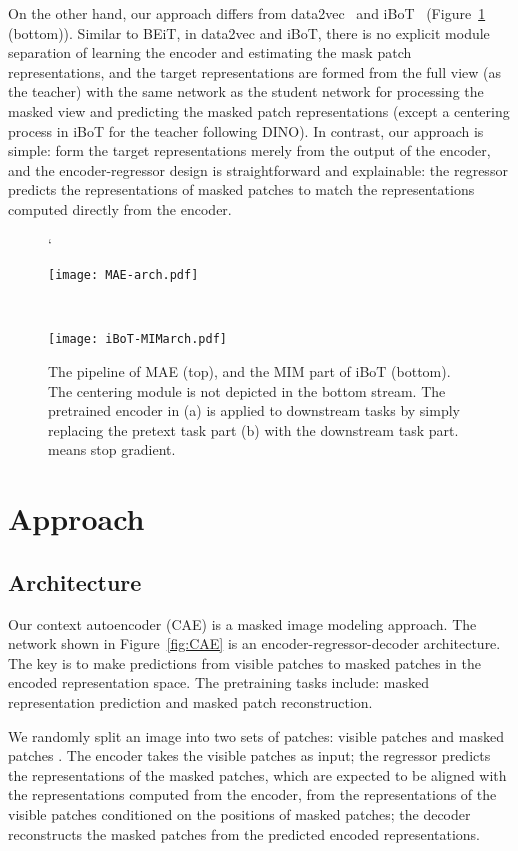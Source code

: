 \documentclass[twocolumn]{svjour3}          \smartqed  \usepackage{graphicx}
\begin{document}
On the other hand,
our approach differs from data2vec~\cite{BaevskiHXBGA22}
and iBoT~\cite{zhou2021ibot} (Figure~\ref{fig:MAEiBoT} (bottom)).
Similar to BEiT,
in data2vec and iBoT,
there is no explicit module separation  
of learning the encoder and estimating the mask patch representations,
and 
the target representations are formed from the full view (as the teacher)
with 
the same network as
the student network for processing the masked view and predicting the masked patch representations (except a centering process in iBoT for the teacher following DINO).
In contrast, our approach is simple:
form the target representations 
merely from the output of the encoder,
and the encoder-regressor design is straightforward
and explainable:
the regressor predicts the representations of masked patches to match the representations 
computed directly from the encoder.

\begin{figure}[t]
\footnotesize`
\centering
\centerline{\texttt{[image: MAE-arch.pdf]}}\\
\centerline{\texttt{[image: iBoT-MIMarch.pdf]}}
\caption{
The pipeline of MAE (top), and the MIM part of iBoT (bottom).
The centering module is not depicted in the bottom stream. The pretrained encoder in (a) 
is applied to downstream tasks
by simply replacing the pretext task part
(b)
with the downstream task part.  means stop gradient.
}
\label{fig:MAEiBoT}
\end{figure}



\section{Approach}
\label{sec:cae}

\subsection{Architecture}
Our context autoencoder (CAE)
is a masked image modeling approach.
The network shown in Figure~\ref{fig:CAE}
is an encoder-regressor-decoder architecture.
The key is to
make predictions from visible patches
to masked patches
in the encoded representation space.
The pretraining tasks include:
masked representation prediction
and masked patch reconstruction. 

We randomly split an image
into two sets of patches:
visible patches 
and masked patches .
The encoder takes the visible patches as input;
the regressor predicts the representations of the masked patches,
which are expected to be aligned
with the representations
computed from the encoder,
from the representations of the visible patches conditioned on the positions of masked patches;
the decoder reconstructs the masked patches
from the predicted encoded representations.
\end{document}
